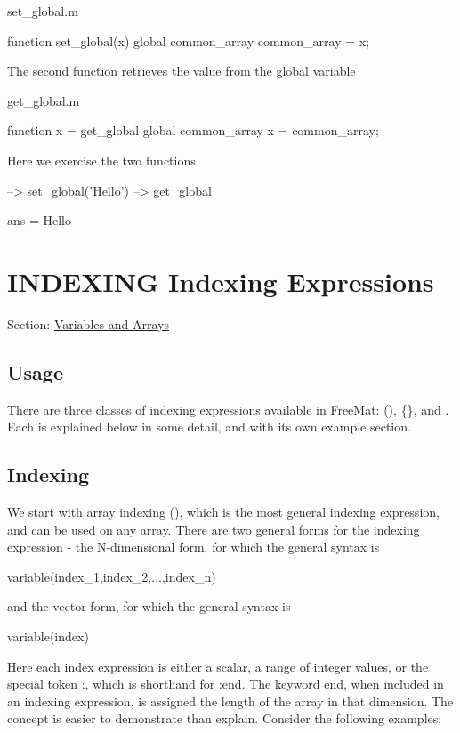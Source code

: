 \begin{DoxyVerb}     set_global.m
\end{DoxyVerb}



\begin{DoxyVerbInclude}
function set_global(x)
  global common_array
  common_array = x;
\end{DoxyVerbInclude}


The second function retrieves the value from the global variable

\begin{DoxyVerb}     get_global.m
\end{DoxyVerb}



\begin{DoxyVerbInclude}
function x = get_global
  global common_array
  x = common_array;
\end{DoxyVerbInclude}


Here we exercise the two functions


\begin{DoxyVerbInclude}
--> set_global('Hello')
--> get_global

ans = 
Hello
\end{DoxyVerbInclude}
 \hypertarget{variables_indexing}{}\section{I\-N\-D\-E\-X\-I\-N\-G Indexing Expressions}\label{variables_indexing}
Section\-: \hyperlink{sec_variables}{Variables and Arrays} \hypertarget{vtkwidgets_vtkxyplotwidget_Usage}{}\subsection{Usage}\label{vtkwidgets_vtkxyplotwidget_Usage}
There are three classes of indexing expressions available in Free\-Mat\-: {\ttfamily ()}, {\ttfamily \{\}}, and {\ttfamily .} Each is explained below in some detail, and with its own example section. \hypertarget{variables_indexing_Array}{}\subsection{Indexing}\label{variables_indexing_Array}
We start with array indexing {\ttfamily ()}, which is the most general indexing expression, and can be used on any array. There are two general forms for the indexing expression -\/ the N-\/dimensional form, for which the general syntax is \begin{DoxyVerb}  variable(index_1,index_2,...,index_n)
\end{DoxyVerb}
 and the vector form, for which the general syntax is \begin{DoxyVerb}  variable(index)
\end{DoxyVerb}
 Here each index expression is either a scalar, a range of integer values, or the special token {\ttfamily \-:}, which is shorthand for {\-:end}. The keyword {\ttfamily end}, when included in an indexing expression, is assigned the length of the array in that dimension. The concept is easier to demonstrate than explain. Consider the following examples\-:


